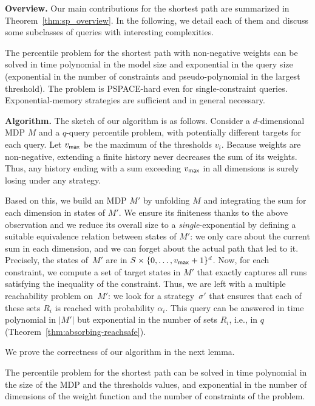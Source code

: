 \documentclass{llncs}
\newcommand{\strat}{\ensuremath{\sigma} }
\newcommand\PSPACE{\textrm{\sf PSPACE}}
\begin{document}
\smallskip\noindent\textbf{Overview.} 
Our main contributions for the shortest path are summarized in Theorem~\ref{thm:sp_overview}. In the following, we detail each of them and discuss some subclasses of queries with interesting complexities.

\begin{theorem}
\label{thm:sp_overview}
The percentile problem for the shortest path with non-negative weights can be solved in time polynomial in the model size
and exponential in the query size (exponential in the number of constraints and pseudo-polynomial in the largest threshold). 
The problem is \PSPACE-hard even for single-constraint queries. Exponential-memory strategies are sufficient and in general necessary.
\end{theorem}

\smallskip\noindent\textbf{Algorithm.} The sketch of our algorithm is as follows. Consider a $d$-dimensional MDP $M$ and a $q$-query percentile problem, with potentially different targets for each query. 
Let $v_{{\sf max}}$ be the maximum of the thresholds $v_i$. Because weights are non-negative, extending a finite history never decreases the sum of its weights.
Thus, any history ending with a sum exceeding $v_{\sf max}$ in all dimensions is surely losing under any strategy.

Based on this, we build an MDP $M'$ by unfolding $M$ and integrating the sum for each dimension in states of $M'$. We ensure its finiteness thanks to the above observation and we reduce its overall size to a \textit{single}-exponential by defining a suitable equivalence relation between states of $M'$: we only care about the current sum in each dimension, and we can forget about the actual path that led to it. Precisely, 
the states of~$M'$ are in $S \times \{0,\ldots,v_{\sf max}+1\}^d$. 
Now, for each constraint, we compute a set of target states in $M'$ that exactly captures all runs satisfying the inequality of the constraint. Thus, we are left with a multiple reachability problem on~$M'$: we look for a strategy~$\strat'$ that ensures that each of these sets $R_{i}$ is reached with probability $\alpha_{i}$. This query can be answered in time polynomial in $\vert M'\vert$ but exponential in the number of sets $R_{i}$, i.e., in $q$ (Theorem~\ref{thm:absorbing-reachsafe}). 

We prove the correctness of our algorithm in the next lemma.

\begin{lemma}
\label{lem:sp_alg}
The percentile problem for the shortest path can be solved in time polynomial in the size of the MDP and the thresholds values, and exponential in the number of dimensions of the weight function and the number of constraints of the problem.
\end{lemma}
\end{document}
